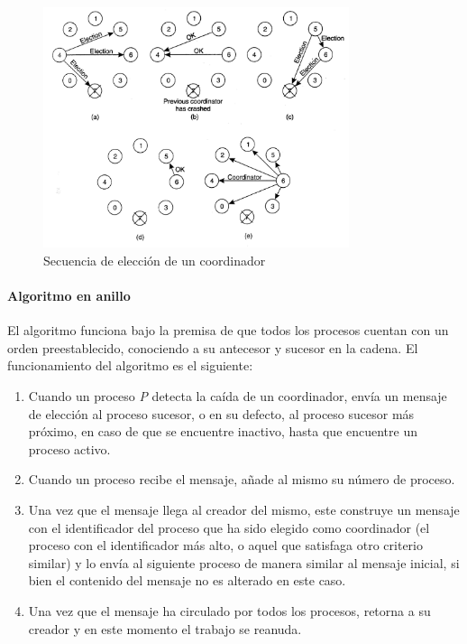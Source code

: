 \begin{figure}[H]
  \centering
  \includegraphics[width=0.8\textwidth]{Chapter2/Figures/bully}
  \caption{Secuencia de elección de un coordinador}
  \label{fig:tanenbaum:bully}
\end{figure}

\paragraph{Algoritmo en anillo}

El algoritmo funciona bajo la premisa de que todos los procesos cuentan con un orden preestablecido, conociendo a su antecesor y sucesor en la cadena\cite{Tanenbaum:2006:DSP:1202502:Ch6}. El funcionamiento del algoritmo es el siguiente:

\begin{enumerate}
  \item Cuando un proceso \textit{P} detecta la caída de un coordinador, envía un mensaje de elección al proceso sucesor, o en su defecto, al proceso sucesor más próximo, en caso de que se encuentre inactivo, hasta que encuentre un proceso activo.
  \item Cuando un proceso recibe el mensaje, añade al mismo su número de proceso.
  \item Una vez que el mensaje llega al creador del mismo, este construye un mensaje con el identificador del proceso que ha sido elegido como coordinador (el proceso con el identificador más alto, o aquel que satisfaga otro criterio similar) y lo envía al siguiente proceso de manera similar al mensaje inicial, si bien el contenido del mensaje no es alterado en este caso.
  \item Una vez que el mensaje ha circulado por todos los procesos, retorna a su creador y en este momento el trabajo se reanuda.
\end{enumerate}

